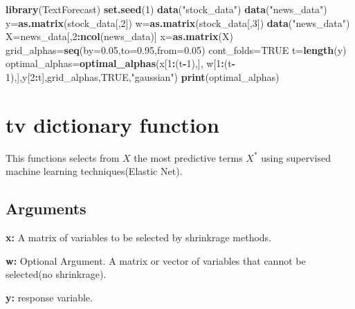 \documentclass[]{article}
\newenvironment{Shaded}{\begin{snugshade}}{\end{snugshade}}
\newcommand{\KeywordTok}[1]{\textcolor[rgb]{0.13,0.29,0.53}{\textbf{#1}}}
\newcommand{\DataTypeTok}[1]{\textcolor[rgb]{0.13,0.29,0.53}{#1}}
\newcommand{\DecValTok}[1]{\textcolor[rgb]{0.00,0.00,0.81}{#1}}
\newcommand{\FloatTok}[1]{\textcolor[rgb]{0.00,0.00,0.81}{#1}}
\newcommand{\StringTok}[1]{\textcolor[rgb]{0.31,0.60,0.02}{#1}}
\newcommand{\OtherTok}[1]{\textcolor[rgb]{0.56,0.35,0.01}{#1}}
\newcommand{\OperatorTok}[1]{\textcolor[rgb]{0.81,0.36,0.00}{\textbf{#1}}}
\newcommand{\NormalTok}[1]{#1}
\begin{document}
\begin{Shaded}
\begin{Highlighting}[]
\KeywordTok{library}\NormalTok{(TextForecast)}
 \KeywordTok{set.seed}\NormalTok{(}\DecValTok{1}\NormalTok{)}
 \KeywordTok{data}\NormalTok{(}\StringTok{"stock_data"}\NormalTok{)}
 \KeywordTok{data}\NormalTok{(}\StringTok{"news_data"}\NormalTok{)}
\NormalTok{ y=}\KeywordTok{as.matrix}\NormalTok{(stock_data[,}\DecValTok{2}\NormalTok{])}
\NormalTok{ w=}\KeywordTok{as.matrix}\NormalTok{(stock_data[,}\DecValTok{3}\NormalTok{])}
 \KeywordTok{data}\NormalTok{(}\StringTok{"news_data"}\NormalTok{)}
\NormalTok{ X=news_data[,}\DecValTok{2}\OperatorTok{:}\KeywordTok{ncol}\NormalTok{(news_data)]}
\NormalTok{ x=}\KeywordTok{as.matrix}\NormalTok{(X)}
\NormalTok{ grid_alphas=}\KeywordTok{seq}\NormalTok{(}\DataTypeTok{by=}\FloatTok{0.05}\NormalTok{,}\DataTypeTok{to=}\FloatTok{0.95}\NormalTok{,}\DataTypeTok{from=}\FloatTok{0.05}\NormalTok{)}
\NormalTok{ cont_folds=}\OtherTok{TRUE}
\NormalTok{ t=}\KeywordTok{length}\NormalTok{(y)}
\NormalTok{ optimal_alphas=}\KeywordTok{optimal_alphas}\NormalTok{(x[}\DecValTok{1}\OperatorTok{:}\NormalTok{(t}\OperatorTok{-}\DecValTok{1}\NormalTok{),],}
\NormalTok{ w[}\DecValTok{1}\OperatorTok{:}\NormalTok{(t}\OperatorTok{-}\DecValTok{1}\NormalTok{),],y[}\DecValTok{2}\OperatorTok{:}\NormalTok{t],grid_alphas,}\OtherTok{TRUE}\NormalTok{,}\StringTok{"gaussian"}\NormalTok{)}
 \KeywordTok{print}\NormalTok{(optimal_alphas)}
\end{Highlighting}
\end{Shaded}

\section{tv dictionary function}\label{tv-dictionary-function}

This functions selects from \(X\) the most predictive terms \(X^{\ast}\)
using supervised machine learning techniques(Elastic Net).

\subsection{Arguments}\label{arguments-5}

\textbf{x:} A matrix of variables to be selected by shrinkrage methods.

\textbf{w:} Optional Argument. A matrix or vector of variables that
cannot be selected(no shrinkrage).

\textbf{y:} response variable.
\end{document}
